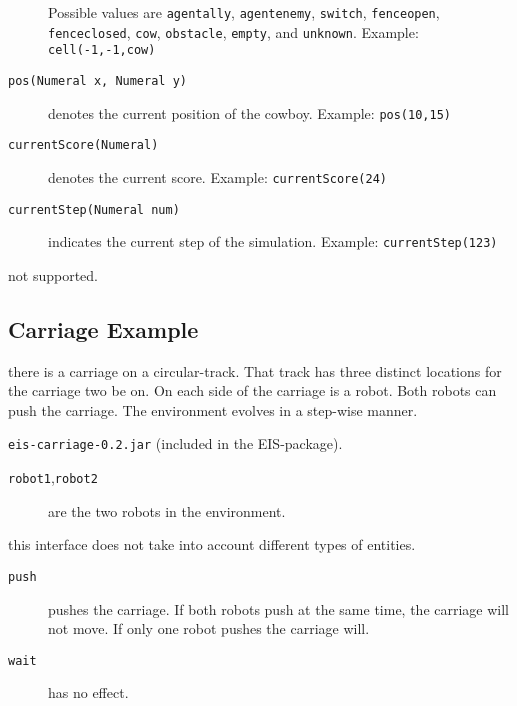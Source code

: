 \documentclass[a4]{article}
\newcommand{\EIS}{\textsf{EIS}\xspace}
\begin{document}
\begin{description}
Possible values are \texttt{agentally}, \texttt{agentenemy}, \texttt{switch}, \texttt{fenceopen}, 
\texttt{fenceclosed}, \texttt{cow}, \texttt{obstacle}, \texttt{empty}, and \texttt{unknown}. 
Example: \texttt{cell(-1,-1,cow)}
\item[\texttt{pos(Numeral x, Numeral y)}] denotes the current position of the cowboy. Example: \texttt{pos(10,15)}
\item[\texttt{currentScore(Numeral)}] denotes the current score. Example: \texttt{currentScore(24)}
\item[\texttt{currentStep(Numeral num)}] indicates the current step of the simulation.
Example: \texttt{currentStep(123)}
\end{description}

 not supported.

\subsection{Carriage Example}

\medskip{} there is a carriage on a circular-track. That track has three 
distinct locations for the carriage two be on. On each side of the carriage is a robot. Both robots can push the carriage.
The environment evolves in a step-wise manner.

\medskip{} \texttt{eis-carriage-0.2.jar} (included in the \EIS-package).

\medskip{}
\begin{description}
\item[\texttt{robot1},\texttt{robot2}] are the two robots in the environment.
\end{description}

 this interface does not take into account different types of entities.

\medskip{}
\begin{description}
\item[\texttt{push}] pushes the carriage. If both robots push at the same time, the carriage will not move. If only
one robot pushes the carriage will.
\item[\texttt{wait}] has no effect.
\end{description}
\end{document}
